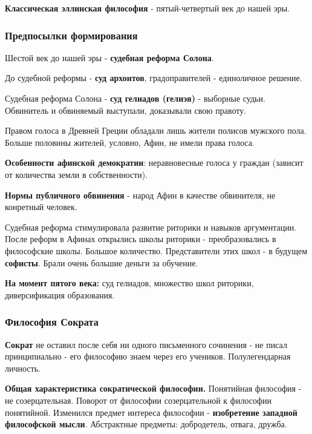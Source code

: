 \documentclass{article}
\begin{document}
\begin{flushleft}

\textbf{Классическая эллинская философия} - пятый-четвертый век до нашей эры. 

\subsubsection{Предпосылки формирования}

Шестой век до нашей эры - \textbf{судебная реформа Солона}.

До судебной реформы - \textbf{суд архонтов}, градоправителей - единоличное решение.

Судебная реформа Солона - \textbf{суд гелиадов (гелиэя)} - выборные судьи. Обвинитель и обвиняемый выступали, доказывали свою правоту.

\hfill

Правом голоса в Древней Греции обладали лишь жители полисов мужского пола. Больше половины жителей, условно, Афин, не имели права голоса.

\hfill

\textbf{Особенности афинской демократии}: неравновесные голоса у граждан (зависит от количества земли в собственности).

\hfill

\textbf{Нормы публичного обвинения} - народ Афин в качестве обвинителя, не конретный человек.

\hfill

Судебная реформа стимулировала развитие риторики и навыков аргументации. После реформ в Афинах открылись школы риторики - преобразовались в философские школы. Большое количество. Представители этих школ - в будущем \textbf{софисты}. Брали очень большие деньги за обучение.

\hfill

\textbf{На момент пятого века:} суд гелиадов, множество школ риторики, диверсификация образования.

\subsubsection{Философия Сократа}

\textbf{Сократ} не оставил после себя ни одного письменного сочинения - не писал принципиально - его философию знаем через его учеников. Полулегендарная личность.

\hfill

\textbf{Общая характеристика сократической философии.} Понятийная философия - не созерцательная. Поворот от философии созерцательной к философии понятийной. Изменился предмет интереса философии - \textbf{изобретение западной философской мысли}. Абстрактные предметы: добродетель, отвага, дружба.


\end{flushleft}
\end{document}
